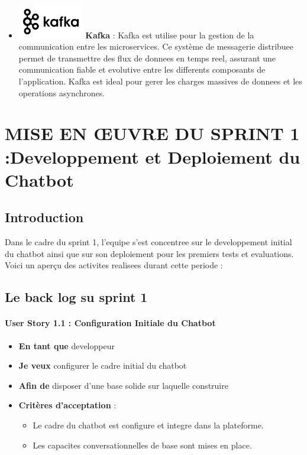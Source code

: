 \documentclass[a4paper, 11pt, openany]{report}
\begin{document}
\begin{itemize}
\item \includegraphics[height=1.5cm]{images/kafka.png} \hspace{5pt} \textbf{Kafka}  : 
Kafka est utilise pour la gestion de la communication entre les microservices. Ce système de messagerie distribuee permet de transmettre des flux de donnees en temps reel, assurant une communication fiable et evolutive entre les differents composants de l'application. Kafka est ideal pour gerer les charges massives de donnees et les operations asynchrones.

\end{itemize}

\chapter{MISE EN ŒUVRE DU SPRINT 1 :Developpement et Deploiement du Chatbot}


\section{Introduction}
Dans le cadre du sprint 1, l'equipe s'est concentree sur le developpement initial du chatbot ainsi que sur son deploiement pour les premiers tests et evaluations. Voici un aperçu des activites realisees durant cette periode :


\section{Le back log su sprint 1}
\subsubsection{User Story 1.1 : Configuration Initiale du Chatbot}

\begin{itemize}
    \item \textbf{En tant que} developpeur
    \item \textbf{Je veux} configurer le cadre initial du chatbot
    \item \textbf{Afin de} disposer d’une base solide sur laquelle construire
    \item \textbf{Critères d’acceptation} :
    \begin{itemize}
        \item Le cadre du chatbot est configure et integre dans la plateforme.
        \item Les capacites conversationnelles de base sont mises en place.
    \end{itemize}
\end{itemize}
\end{document}
